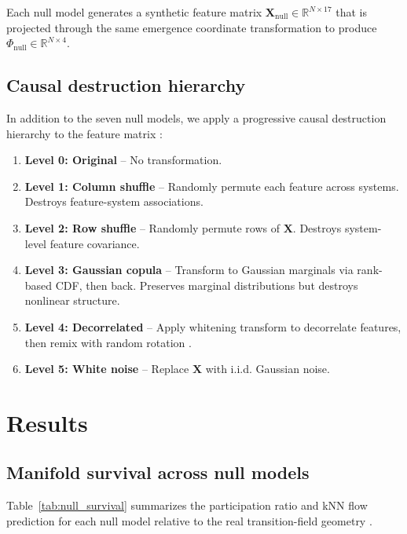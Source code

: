 \documentclass[aip,chaos,showpacs,superscriptaddress,groupedaddress]{revtex4-1}
\begin{document}
Each null model generates a synthetic feature matrix $\mathbf{X}_{\text{null}} \in \mathbb{R}^{N \times 17}$ that is projected through the same emergence coordinate transformation to produce $\Phi_{\text{null}} \in \mathbb{R}^{N \times 4}$.

\subsection{Causal destruction hierarchy}
\label{sec:destruction_hierarchy}

In addition to the seven null models, we apply a progressive causal destruction hierarchy to the feature matrix \cite{crutchfield1986equivalence}:
\begin{enumerate}
\item \textbf{Level 0: Original} -- No transformation.
\item \textbf{Level 1: Column shuffle} -- Randomly permute each feature across systems. Destroys feature-system associations.
\item \textbf{Level 2: Row shuffle} -- Randomly permute rows of $\mathbf{X}$. Destroys system-level feature covariance.
\item \textbf{Level 3: Gaussian copula} -- Transform to Gaussian marginals via rank-based CDF, then back. Preserves marginal distributions but destroys nonlinear structure.
\item \textbf{Level 4: Decorrelated} -- Apply whitening transform to decorrelate features, then remix with random rotation \cite{memoli2011gromov}.
\item \textbf{Level 5: White noise} -- Replace $\mathbf{X}$ with i.i.d. Gaussian noise.
\end{enumerate}

\section{Results}
\label{sec:results}

\subsection{Manifold survival across null models}
\label{sec:survival}

Table~\ref{tab:null_survival} summarizes the participation ratio and kNN flow prediction for each null model relative to the real transition-field geometry \cite{kantz1994robust}.
\end{document}

